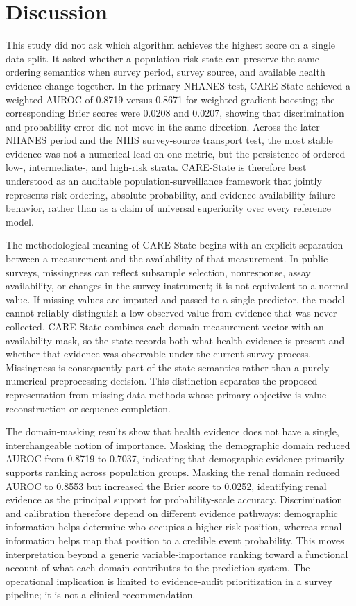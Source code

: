 \documentclass[12pt]{article}
\begin{document}
\section{Discussion}
This study did not ask which algorithm achieves the highest score on a single data split. It asked whether a population risk state can preserve the same ordering semantics when survey period, survey source, and available health evidence change together. In the primary NHANES test, CARE-State achieved a weighted AUROC of 0.8719 versus 0.8671 for weighted gradient boosting; the corresponding Brier scores were 0.0208 and 0.0207, showing that discrimination and probability error did not move in the same direction. Across the later NHANES period and the NHIS survey-source transport test, the most stable evidence was not a numerical lead on one metric, but the persistence of ordered low-, intermediate-, and high-risk strata. CARE-State is therefore best understood as an auditable population-surveillance framework that jointly represents risk ordering, absolute probability, and evidence-availability failure behavior, rather than as a claim of universal superiority over every reference model.

The methodological meaning of CARE-State begins with an explicit separation between a measurement and the availability of that measurement. In public surveys, missingness can reflect subsample selection, nonresponse, assay availability, or changes in the survey instrument; it is not equivalent to a normal value. If missing values are imputed and passed to a single predictor, the model cannot reliably distinguish a low observed value from evidence that was never collected. CARE-State combines each domain measurement vector with an availability mask, so the state records both what health evidence is present and whether that evidence was observable under the current survey process. Missingness is consequently part of the state semantics rather than a purely numerical preprocessing decision. This distinction separates the proposed representation from missing-data methods whose primary objective is value reconstruction or sequence completion.

The domain-masking results show that health evidence does not have a single, interchangeable notion of importance. Masking the demographic domain reduced AUROC from 0.8719 to 0.7037, indicating that demographic evidence primarily supports ranking across population groups. Masking the renal domain reduced AUROC to 0.8553 but increased the Brier score to 0.0252, identifying renal evidence as the principal support for probability-scale accuracy. Discrimination and calibration therefore depend on different evidence pathways: demographic information helps determine who occupies a higher-risk position, whereas renal information helps map that position to a credible event probability. This moves interpretation beyond a generic variable-importance ranking toward a functional account of what each domain contributes to the prediction system. The operational implication is limited to evidence-audit prioritization in a survey pipeline; it is not a clinical recommendation.
\end{document}
